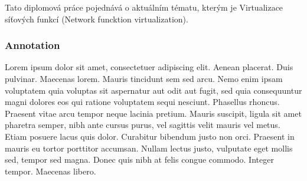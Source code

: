 \documentclass[a4paper,czech,czech,openright,cleardoubleempty,BCOR10mm,DIV11]{scrreprt}
\begin{document}
Tato diplomová práce pojednává o aktuálním tématu, kterým je Virtualizace síťových funkcí (Network funcktion virtualization). 

\subsubsection{Annotation}

Lorem ipsum dolor sit amet, consectetuer adipiscing elit. Aenean placerat. Duis pulvinar. Maecenas lorem. Mauris tincidunt sem sed arcu. Nemo enim ipsam voluptatem quia voluptas sit aspernatur aut odit aut fugit, sed quia consequuntur magni dolores eos qui ratione voluptatem sequi nesciunt. Phasellus rhoncus. Praesent vitae arcu tempor neque lacinia pretium. Mauris suscipit, ligula sit amet pharetra semper, nibh ante cursus purus, vel sagittis velit mauris vel metus. Etiam posuere lacus quis dolor. Curabitur bibendum justo non orci. Praesent in mauris eu tortor porttitor accumsan. Nullam lectus justo, vulputate eget mollis sed, tempor sed magna. Donec quis nibh at felis congue commodo. Integer tempor. Maecenas libero.


\cleardoublepage{}

{\small %
}{\small \par}

\cleardoublepage{}\thispagestyle{empty}{\small 


\tableofcontents{}%
\cleardoublepage{}}{\small \par}












\cleardoublepage{}




\end{document}
